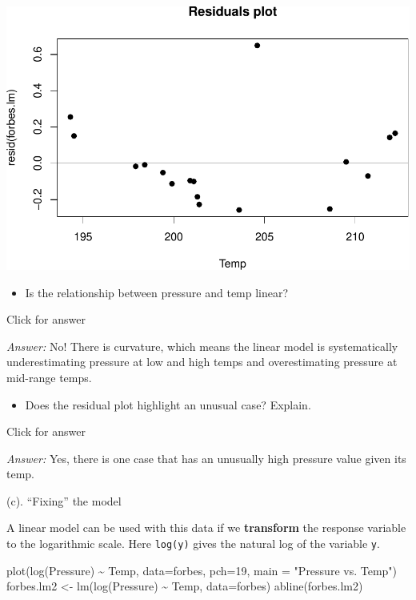 \documentclass[
]{book}
\newenvironment{Shaded}{\begin{snugshade}}{\end{snugshade}}
\newcommand{\AttributeTok}[1]{\textcolor[rgb]{0.77,0.63,0.00}{#1}}
\newcommand{\DecValTok}[1]{\textcolor[rgb]{0.00,0.00,0.81}{#1}}
\newcommand{\FunctionTok}[1]{\textcolor[rgb]{0.00,0.00,0.00}{#1}}
\newcommand{\NormalTok}[1]{#1}
\newcommand{\OtherTok}[1]{\textcolor[rgb]{0.56,0.35,0.01}{#1}}
\newcommand{\SpecialCharTok}[1]{\textcolor[rgb]{0.00,0.00,0.00}{#1}}
\newcommand{\StringTok}[1]{\textcolor[rgb]{0.31,0.60,0.02}{#1}}
\providecommand{\tightlist}{%
  \setlength{\itemsep}{0pt}\setlength{\parskip}{0pt}}
\begin{document}
\includegraphics[width=1\linewidth]{Class_Activity_6_files/figure-latex/unnamed-chunk-30-1}

\begin{itemize}
\tightlist
\item
  Is the relationship between pressure and temp linear?
\end{itemize}

Click for answer

\emph{Answer:} No! There is curvature, which means the linear model is systematically underestimating pressure at low and high temps and overestimating pressure at mid-range temps.

\begin{itemize}
\tightlist
\item
  Does the residual plot highlight an unusual case? Explain.
\end{itemize}

Click for answer

\emph{Answer:} Yes, there is one case that has an unusually high pressure value given its temp.

(c). ``Fixing'' the model

A linear model can be used with this data if we \textbf{transform} the response variable to the logarithmic scale. Here \texttt{log(y)} gives the natural log of the variable \texttt{y}.

\begin{Shaded}
\begin{Highlighting}[]
\FunctionTok{plot}\NormalTok{(}\FunctionTok{log}\NormalTok{(Pressure) }\SpecialCharTok{\textasciitilde{}}\NormalTok{ Temp, }\AttributeTok{data=}\NormalTok{forbes, }\AttributeTok{pch=}\DecValTok{19}\NormalTok{, }\AttributeTok{main =} \StringTok{"Pressure vs. Temp"}\NormalTok{)}
\NormalTok{forbes.lm2 }\OtherTok{\textless{}{-}} \FunctionTok{lm}\NormalTok{(}\FunctionTok{log}\NormalTok{(Pressure) }\SpecialCharTok{\textasciitilde{}}\NormalTok{ Temp, }\AttributeTok{data=}\NormalTok{forbes)}
\FunctionTok{abline}\NormalTok{(forbes.lm2)}
\end{Highlighting}
\end{Shaded}
\end{document}
